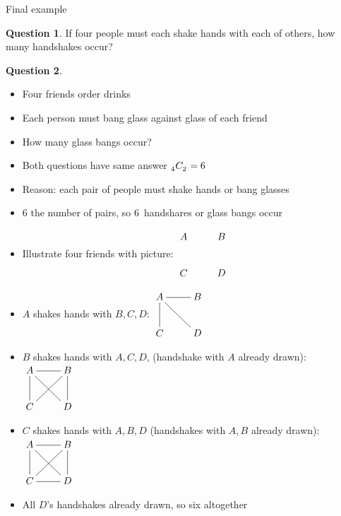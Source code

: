 \documentclass[handout]{beamer}
\theoremstyle{definition}
\newtheorem{question}{Question}
\newcommand\ncr[2]{\tensor[_{#1}]C{_{#2}}}
\begin{document}
\begin{frame}{Final example}
\begin{question}
If four people must each shake hands with each of others,
how many handshakes occur?
\end{question}
\begin{question}
\begin{itemize}
\item Four friends order drinks
\item Each person must bang glass against glass of each friend
\item How many glass bangs occur?
\end{itemize}
\end{question}
\begin{itemize}
\item Both questions have same answer $\ncr{4}{2}=6$
\item Reason: each pair of people must shake hands or bang glasses
\item $6$ the number of pairs, so $6$~handshares or glass bangs occur
\end{itemize}
\end{frame}

\begin{frame}
\begin{itemize}
\item Illustrate four friends with picture:
$\vcenter{\begin{xy}\xymatrix{
A&B\\C&D}\end{xy}}$
\item $A$ shakes hands with $B,C,D$:
$\vcenter{\begin{xy}\xymatrix{
A\ar@{-}[r]\ar@{-}[d]\ar@{-}[dr]&B\\
C&D}\end{xy}}$
\item $B$ shakes hands with $A,C,D$,
(handshake with $A$ already drawn):
$\vcenter{\begin{xy}\xymatrix{
A\ar@{-}[r]\ar@{-}[d]\ar@{-}[dr]&B\ar@{-}[dl]\ar@{-}[d]\\
C&D}\end{xy}}$
\item $C$ shakes hands with $A,B,D$ (handshakes with
$A,B$ already drawn):
$\vcenter{\begin{xy}\xymatrix{
A\ar@{-}[r]\ar@{-}[d]\ar@{-}[dr]&B\ar@{-}[dl]\ar@{-}[d]\\
C\ar@{-}[r]&D}\end{xy}}$
\item All $D$'s handshakes already drawn, so six altogether
\end{itemize}
\end{frame}
\end{document}
